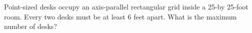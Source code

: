 Point-sized desks occupy an axis-parallel rectangular grid inside a 25-by 25-foot room. Every two desks must be at least 6 feet apart. What is the maximum number of desks?
